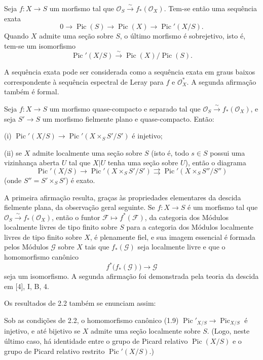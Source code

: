 
 Seja $f:X\longrightarrow S$ um morfismo tal que
$\mathcal O_S\xrightarrow{\sim}f_*(\mathcal O_X)$. Tem-se então uma sequência
exata
\[
0\longrightarrow\operatorname{Pic}(S)\longrightarrow\operatorname{Pic}(X)
\longrightarrow\operatorname{Pic}'(X/S).
\]
Quando $X$ admite uma seção sobre $S$, o último morfismo é sobrejetivo, isto é,
tem-se um isomorfismo
\[
\operatorname{Pic}'(X/S)\xrightarrow{\sim}
\operatorname{Pic}(X)/\operatorname{Pic}(S).
\]

A sequência exata pode ser considerada como a sequência exata em graus baixos
correspondente à sequência espectral de Leray para $f$ e $\mathcal O_X^*$. A
segunda afirmação também é formal.

 Seja $f:X\longrightarrow S$ um morfismo quase-compacto
e separado tal que $\mathcal O_S\xrightarrow{\sim}f_*(\mathcal O_X)$, e seja
$S'\longrightarrow S$ um morfismo fielmente plano e quase-compacto. Então:

\noindent (i) $\operatorname{Pic}'(X/S)\longrightarrow
\operatorname{Pic}'(X\times_SS'/S')$ é injetivo;

\noindent (ii) se $X$ admite localmente uma seção sobre $S$ (isto é, todo
$s\in S$ possui uma vizinhança aberta $U$ tal que $X|U$ tenha uma seção sobre
$U$), então o diagrama
\[
\operatorname{Pic}'(X/S)\longrightarrow
\operatorname{Pic}'(X\times_SS'/S')\rightrightarrows
\operatorname{Pic}'(X\times_SS''/S'')
\]
(onde $S''=S'\times_SS'$) é exato.

A primeira afirmação resulta, graças às propriedades elementares da descida
fielmente plana, da observação geral seguinte. Se $f:X\longrightarrow S$ é um
morfismo tal que $\mathcal O_S\xrightarrow{\sim}f_*(\mathcal O_X)$, então o
funtor $\mathcal F\longmapsto f^*(\mathcal F)$, da categoria dos Módulos
localmente livres de tipo finito sobre $S$ para a categoria dos Módulos
localmente livres de tipo finito sobre $X$, é plenamente fiel, e sua imagem
essencial é formada pelos Módulos $\mathcal G$ sobre $X$ tais que
$f_*(\mathcal G)$ seja localmente livre e que o homomorfismo canônico
\[
f^*\bigl(f_*(\mathcal G)\bigr)\longrightarrow\mathcal G
\]
seja um isomorfismo. A segunda afirmação foi demonstrada pela teoria da descida
em [4], I, B, 4.

Os resultados de 2.2 também se enunciam assim:

 Sob as condições de 2.2, o homomorfismo canônico
(1.9) $\operatorname{Pic}'_{X/S}\longrightarrow\operatorname{Pic}_{X/S}$ é
injetivo, e até bijetivo se $X$ admite uma seção localmente sobre $S$. (Logo,
neste último caso, há identidade entre o grupo de Picard relativo
$\operatorname{Pic}(X/S)$ e o grupo de Picard relativo restrito
$\operatorname{Pic}'(X/S)$.)

